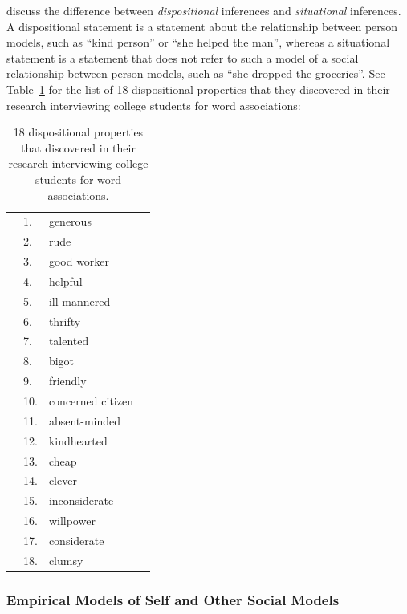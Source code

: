 \cite{winter:2005} discuss the difference between \emph{dispositional} inferences and \emph{situational} inferences.
A dispositional statement is a statement about the relationship between person models, such as ``kind person'' or ``she helped the man'', whereas a situational statement is a statement that does not refer to such a model of a social relationship between person models, such as ``she dropped the groceries''.
See Table~\ref{tab:winter_dispositional_properties} for the list of 18 dispositional properties that they discovered in their research interviewing college students for word associations:

\begin{table}
  \myfloatalign
  \begin{tabularx}{\textwidth}{XllX}
    & 1.  & generous          & \\
    & 2.  & rude              & \\
    & 3.  & good worker       & \\
    & 4.  & helpful           & \\
    & 5.  & ill-mannered      & \\
    & 6.  & thrifty           & \\
    & 7.  & talented          & \\
    & 8.  & bigot             & \\
    & 9.  & friendly          & \\
    & 10. & concerned citizen & \\
    & 11. & absent-minded     & \\
    & 12. & kindhearted       & \\
    & 13. & cheap             & \\
    & 14. & clever            & \\
    & 15. & inconsiderate     & \\
    & 16. & willpower         & \\
    & 17. & considerate       & \\
    & 18. & clumsy            & 
  \end{tabularx}
  \caption[18 dispositional properties]{18 dispositional properties
    that  discovered in their research
    interviewing college students for word associations.}
  \label{tab:winter_dispositional_properties}
\end{table}


\subsubsection{Empirical Models of Self and Other Social Models}

